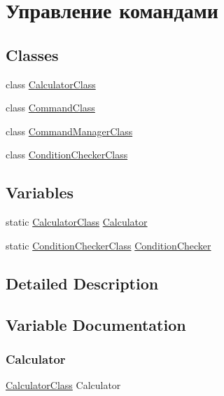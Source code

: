 \hypertarget{group___command_managment}{}\section{Управление командами}
\label{group___command_managment}
\subsection*{Classes}
\begin{DoxyCompactItemize}
\item 
class \hyperlink{class_calculator_class}{Calculator\+Class}
\item 
class \hyperlink{class_command_class}{Command\+Class}
\item 
class \hyperlink{class_command_manager_class}{Command\+Manager\+Class}
\item 
class \hyperlink{class_condition_checker_class}{Condition\+Checker\+Class}
\end{DoxyCompactItemize}
\subsection*{Variables}
\begin{DoxyCompactItemize}
\item 
static \hyperlink{class_calculator_class}{Calculator\+Class} \hyperlink{group___command_managment_ga9af265a9ba6c0c3e9516d08778b301e0}{Calculator}
\item 
static \hyperlink{class_condition_checker_class}{Condition\+Checker\+Class} \hyperlink{group___command_managment_gab07d033ff3c0d63236ae5041cd9df725}{Condition\+Checker}
\end{DoxyCompactItemize}


\subsection{Detailed Description}


\subsection{Variable Documentation}
\mbox{\label{group___command_managment_ga9af265a9ba6c0c3e9516d08778b301e0}} 
\subsubsection{\texorpdfstring{Calculator}{Calculator}}
{\footnotesize\ttfamily \hyperlink{class_calculator_class}{Calculator\+Class} Calculator\hspace{0.3cm}{\ttfamily [static]}}

